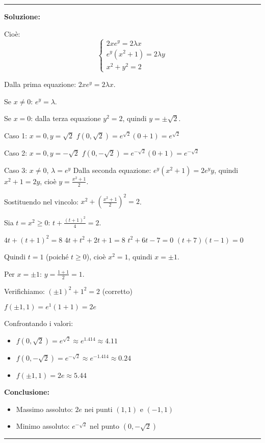 \documentclass[12pt, a4paper]{article}
\newenvironment{solution}
{\par\noindent\rule{\textwidth}{0.4pt}\par\textbf{Soluzione:}\medskip\par}
{\par\rule{\textwidth}{0.4pt}\par\bigskip}
\begin{document}
\begin{solution}
Cioè:
\[
\begin{cases}
2xe^y = 2\lambda x \\
e^y(x^2 + 1) = 2\lambda y \\
x^2 + y^2 = 2
\end{cases}
\]

Dalla prima equazione: $2xe^y = 2\lambda x$.

Se $x \neq 0$: $e^y = \lambda$.

Se $x = 0$: dalla terza equazione $y^2 = 2$, quindi $y = \pm\sqrt{2}$.

Caso 1: $x = 0, y = \sqrt{2}$
$f(0, \sqrt{2}) = e^{\sqrt{2}}(0 + 1) = e^{\sqrt{2}}$

Caso 2: $x = 0, y = -\sqrt{2}$
$f(0, -\sqrt{2}) = e^{-\sqrt{2}}(0 + 1) = e^{-\sqrt{2}}$

Caso 3: $x \neq 0$, $\lambda = e^y$
Dalla seconda equazione: $e^y(x^2 + 1) = 2e^y y$, quindi $x^2 + 1 = 2y$, cioè $y = \frac{x^2 + 1}{2}$.

Sostituendo nel vincolo: $x^2 + \left(\frac{x^2 + 1}{2}\right)^2 = 2$.

Sia $t = x^2 \geq 0$: $t + \frac{(t + 1)^2}{4} = 2$.

$4t + (t + 1)^2 = 8$
$4t + t^2 + 2t + 1 = 8$
$t^2 + 6t - 7 = 0$
$(t + 7)(t - 1) = 0$

Quindi $t = 1$ (poiché $t \geq 0$), cioè $x^2 = 1$, quindi $x = \pm 1$.

Per $x = \pm 1$: $y = \frac{1 + 1}{2} = 1$.

Verifichiamo: $(\pm 1)^2 + 1^2 = 2$ (corretto)

$f(\pm 1, 1) = e^1(1 + 1) = 2e$

Confrontando i valori:
\begin{itemize}
    \item $f(0, \sqrt{2}) = e^{\sqrt{2}} \approx e^{1.414} \approx 4.11$
    \item $f(0, -\sqrt{2}) = e^{-\sqrt{2}} \approx e^{-1.414} \approx 0.24$
    \item $f(\pm 1, 1) = 2e \approx 5.44$
\end{itemize}

\textbf{Conclusione:}
\begin{itemize}
    \item Massimo assoluto: $2e$ nei punti $(1,1)$ e $(-1,1)$
    \item Minimo assoluto: $e^{-\sqrt{2}}$ nel punto $(0,-\sqrt{2})$
\end{itemize}
\end{solution}
\end{document}
